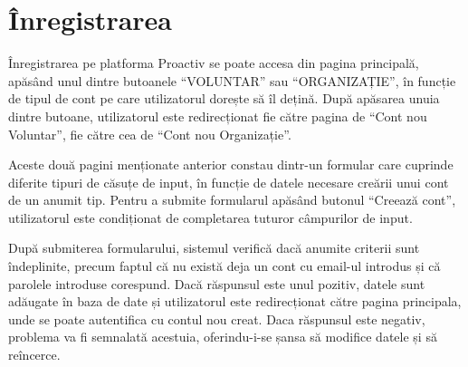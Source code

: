 \documentclass[12pt,a4paper]{report}
\begin{document}
\section{Înregistrarea}
\par
Înregistrarea pe platforma Proactiv se poate accesa din pagina principală, apăsând unul dintre butoanele  “VOLUNTAR” sau  “ORGANIZAȚIE”, în funcție de tipul de cont pe care utilizatorul dorește să îl dețină. După apăsarea unuia dintre butoane, utilizatorul este redirecționat fie către pagina de  “Cont nou Voluntar”, fie către cea de  “Cont nou Organizație”.
\\
\par
Aceste două pagini menționate anterior constau dintr-un formular care cuprinde diferite tipuri de căsuțe de input, în funcție de datele necesare creării unui cont de un anumit tip. Pentru a submite formularul apăsând butonul  “Creează cont”, utilizatorul este condiționat de completarea tuturor câmpurilor de input. 
\\
\par
După submiterea formularului, sistemul verifică dacă anumite criterii sunt îndeplinite, precum faptul că nu există deja un cont cu email-ul introdus și că parolele introduse corespund. Dacă răspunsul este unul pozitiv, datele sunt adăugate în baza de date și utilizatorul este redirecționat către pagina principala, unde se poate autentifica cu contul nou creat. Daca răspunsul este negativ, problema va fi semnalată acestuia, oferindu-i-se șansa să modifice datele și să reîncerce.
\\
\lstset{showstringspaces=false}
\end{document}
